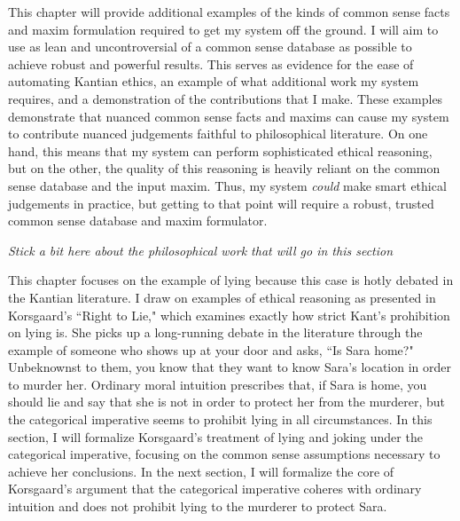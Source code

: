 \begin{isabellebody}
\begin{isamarkuptext}
This chapter will provide additional examples of the kinds of common sense facts and maxim formulation required to get my system
off the ground. I will aim to use as lean and uncontroversial of a common sense database as possible
to achieve robust and powerful results. This serves as evidence for the ease of automating
Kantian ethics, an example of what additional work my system requires, and a demonstration of the contributions
that I make. These examples demonstrate that nuanced common sense facts and maxims can cause my system to contribute 
nuanced judgements faithful to philosophical literature. On one hand, this means that my system can perform
sophisticated ethical reasoning, but on the other, the quality of this reasoning is heavily reliant on 
the common sense database and the input maxim. Thus, my system \emph{could} make smart ethical judgements 
in practice, but getting to that point will require a robust, trusted common sense database and maxim
formulator.

\emph{Stick a bit here about the philosophical work that will go in this section}%
\end{isamarkuptext}\isamarkuptrue%
%
\isadelimdocument
%
\endisadelimdocument
%
\isatagdocument
%
\isamarkuptrue%
%
\endisatagdocument
{\isafolddocument}%
%
\isadelimdocument
%
\endisadelimdocument
%
\begin{isamarkuptext}%
This chapter focuses on the example of lying because this case is hotly debated in the Kantian
literature. I draw on examples of ethical reasoning as presented in Korsgaard's ``Right to Lie," which 
examines exactly how strict Kant's prohibition on lying is. She picks up a long-running debate in the 
literature through the example of someone who shows up at your door and asks, ``Is Sara home?" Unbeknownst to them, 
you know that they want to know Sara's location in order to murder her. Ordinary moral intuition 
prescribes that, if Sara is home, you should lie and say that she is not in order to 
protect her from the murderer, but the categorical imperative seems to prohibit lying in all 
circumstances. In this section, I will formalize Korsgaard's treatment of lying and joking under the 
categorical imperative, focusing on the common sense assumptions necessary to achieve her conclusions. 
In the next section, I will formalize the core of Korsgaard's argument that the categorical imperative
coheres with ordinary intuition and does not prohibit lying to the murderer to protect Sara.


\end{isamarkuptext}
\end{isabellebody}
